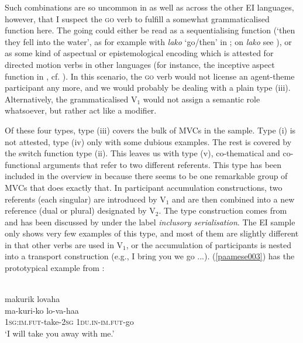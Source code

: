\largerpage[-1]
Such combinations are so uncommon in  as well as across the other EI languages, however, that I suspect the \textsc{go} verb to fulfill a somewhat grammaticalised function here. The going could either be read as a sequentialising function (`then they fell into the water', as for example with \textit{lako} `go/then' in ; on  \textit{lako} see ), or as some kind of aspectual or epistemological encoding which is attested for directed motion verbs in other languages (for instance, the inceptive aspect function in , cf. \citealt[297]{gravelle2010grammar}). In this scenario, the \textsc{go} verb would not license an agent-theme participant any more, and we would probably be dealing with a plain type (iii). Alternatively, the grammaticalised V$_1$ would not assign a semantic role whatsoever, but rather act like a modifier.

Of these four types, type (iii) covers the bulk of MVCs in the sample. Type (i) is not attested, type (iv) only with some dubious examples. The rest is covered by the switch function type (ii). This leaves us with type (v), co-thematical and co-functional arguments that refer to two different referents. This type has been included in the overview in  because there seems to be one remarkable group of MVCs that does exactly that. In participant accumulation constructions, two referents (each singular) are introduced by V$_1$ and are then combined into a new reference (dual or plural) designated by V$_2$. The type construction comes from  and has been discussed by \citet[41]{crowley2002serial} under the label \textit{inclusory serialisation}. The EI sample only shows very few examples of this type, and most of them are slightly different in that other verbs are used in V$_1$, or the accumulation of participants is nested into a transport construction (e.g., I bring you we go ...). (\ref{paamese003}) has the prototypical example from :

\ea \label{paamese003}
\\
\glll makurik lovaha \\
ma-kuri-ko lo-va-haa \\
1\textsc{sg}:\textsc{im}.\textsc{fut}-take-2\textsc{sg} 1\textsc{du}.\textsc{in}-\textsc{im}.\textsc{fut}-go \\
\glft `I will take you away with me.'\\ 
\z


